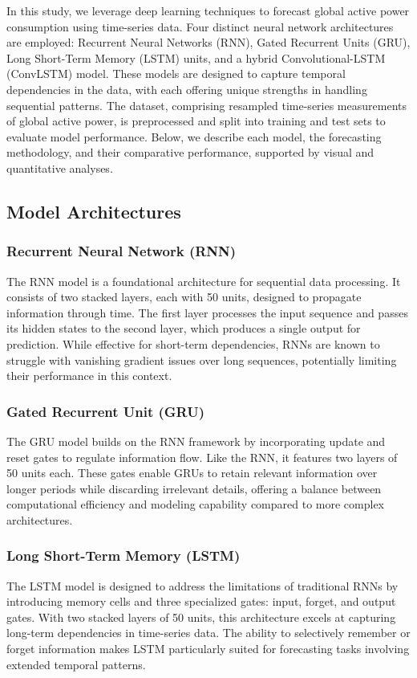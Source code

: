 	In this study, we leverage deep learning techniques to forecast global active power consumption using time-series data. Four distinct neural network architectures are employed: Recurrent Neural Networks (RNN), Gated Recurrent Units (GRU), Long Short-Term Memory (LSTM) units, and a hybrid Convolutional-LSTM (ConvLSTM) model. These models are designed to capture temporal dependencies in the data, with each offering unique strengths in handling sequential patterns. The dataset, comprising resampled time-series measurements of global active power, is preprocessed and split into training and test sets to evaluate model performance. Below, we describe each model, the forecasting methodology, and their comparative performance, supported by visual and quantitative analyses.
	
	\subsection{Model Architectures}
	
	\subsubsection{Recurrent Neural Network (RNN)}
	The RNN model is a foundational architecture for sequential data processing. It consists of two stacked layers, each with 50 units, designed to propagate information through time. The first layer processes the input sequence and passes its hidden states to the second layer, which produces a single output for prediction. While effective for short-term dependencies, RNNs are known to struggle with vanishing gradient issues over long sequences, potentially limiting their performance in this context.
	
	\subsubsection{Gated Recurrent Unit (GRU)}
	The GRU model builds on the RNN framework by incorporating update and reset gates to regulate information flow. Like the RNN, it features two layers of 50 units each. These gates enable GRUs to retain relevant information over longer periods while discarding irrelevant details, offering a balance between computational efficiency and modeling capability compared to more complex architectures.
	
	\subsubsection{Long Short-Term Memory (LSTM)}
	The LSTM model is designed to address the limitations of traditional RNNs by introducing memory cells and three specialized gates: input, forget, and output gates. With two stacked layers of 50 units, this architecture excels at capturing long-term dependencies in time-series data. The ability to selectively remember or forget information makes LSTM particularly suited for forecasting tasks involving extended temporal patterns.
	
